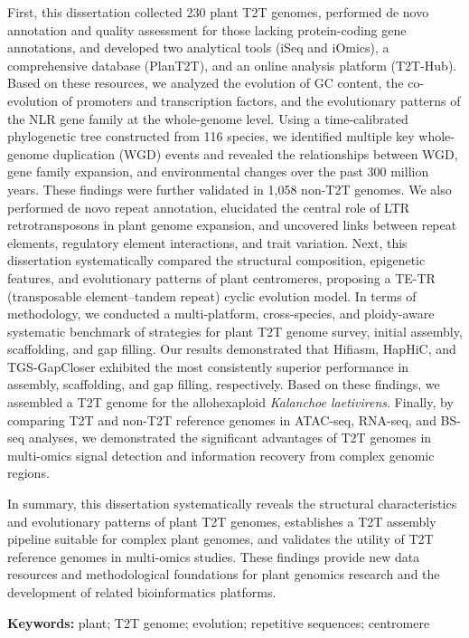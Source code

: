 First, this dissertation collected 230 plant T2T genomes, performed de novo annotation and quality assessment for those lacking protein-coding gene annotations, and developed two analytical tools (iSeq and iOmics), a comprehensive database (PlanT2T), and an online analysis platform (T2T-Hub). Based on these resources, we analyzed the evolution of GC content, the co-evolution of promoters and transcription factors, and the evolutionary patterns of the NLR gene family at the whole-genome level. Using a time-calibrated phylogenetic tree constructed from 116 species, we identified multiple key whole-genome duplication (WGD) events and revealed the relationships between WGD, gene family expansion, and environmental changes over the past 300 million years. These findings were further validated in 1,058 non-T2T genomes. We also performed de novo repeat annotation, elucidated the central role of LTR retrotransposons in plant genome expansion, and uncovered links between repeat elements, regulatory element interactions, and trait variation. Next, this dissertation systematically compared the structural composition, epigenetic features, and evolutionary patterns of plant centromeres, proposing a TE-TR (transposable element–tandem repeat) cyclic evolution model. In terms of methodology, we conducted a multi-platform, cross-species, and ploidy-aware systematic benchmark of strategies for plant T2T genome survey, initial assembly, scaffolding, and gap filling. Our results demonstrated that Hifiasm, HapHiC, and TGS-GapCloser exhibited the most consistently superior performance in assembly, scaffolding, and gap filling, respectively. Based on these findings, we assembled a T2T genome for the allohexaploid \textit{Kalanchoe laetivirens}. Finally, by comparing T2T and non-T2T reference genomes in ATAC-seq, RNA-seq, and BS-seq analyses, we demonstrated the significant advantages of T2T genomes in multi-omics signal detection and information recovery from complex genomic regions.

In summary, this dissertation systematically reveals the structural characteristics and evolutionary patterns of plant T2T genomes, establishes a T2T assembly pipeline suitable for complex plant genomes, and validates the utility of T2T reference genomes in multi-omics studies. These findings provide new data resources and methodological foundations for plant genomics research and the development of related bioinformatics platforms.

\noindent\textbf{Keywords:} plant; T2T genome; evolution; repetitive sequences; centromere
